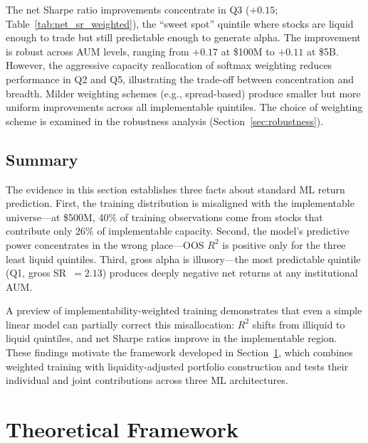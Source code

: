 \documentclass[a4paper,12pt,final]{article}
\begin{document}


The net Sharpe ratio improvements concentrate in Q3 ($+0.15$; Table~\ref{tab:net_sr_weighted}), the ``sweet spot'' quintile where stocks are liquid enough to trade but still predictable enough to generate alpha. The improvement is robust across AUM levels, ranging from $+0.17$ at \$100M to $+0.11$ at \$5B. However, the aggressive capacity reallocation of softmax weighting reduces performance in Q2 and Q5, illustrating the trade-off between concentration and breadth. Milder weighting schemes (e.g., spread-based) produce smaller but more uniform improvements across all implementable quintiles. The choice of weighting scheme is examined in the robustness analysis (Section~\ref{sec:robustness}).

\subsection{Summary}
\label{subsec:motivation_summary}

The evidence in this section establishes three facts about standard ML return prediction. First, the training distribution is misaligned with the implementable universe---at \$500M, 40\% of training observations come from stocks that contribute only 26\% of implementable capacity. Second, the model's predictive power concentrates in the wrong place---OOS $R^2$ is positive only for the three least liquid quintiles. Third, gross alpha is illusory---the most predictable quintile (Q1, gross SR~$= 2.13$) produces deeply negative net returns at any institutional AUM.

A preview of implementability-weighted training demonstrates that even a simple linear model can partially correct this misallocation: $R^2$ shifts from illiquid to liquid quintiles, and net Sharpe ratios improve in the implementable region. These findings motivate the framework developed in Section~\ref{sec:framework}, which combines weighted training with liquidity-adjusted portfolio construction and tests their individual and joint contributions across three ML architectures.


\section{Theoretical Framework}
\label{sec:framework}
\end{document}
